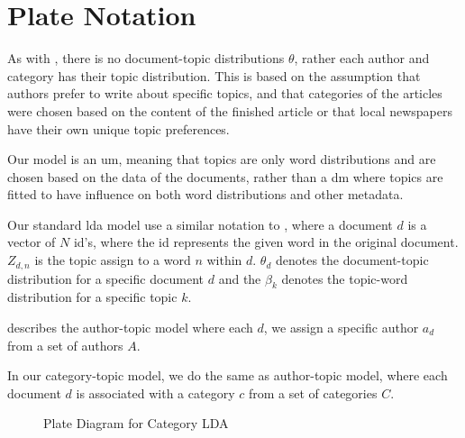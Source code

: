 \section{Plate Notation}
As with \citet{author_topic_2012}, there is no document-topic distributions $\theta$, rather each author and category has their topic distribution.
This is based on the assumption that authors prefer to write about specific topics, and that categories of the articles were chosen based on the content of the finished article or that local newspapers have their own unique topic preferences.

Our model is an \gls{um}, meaning that topics are only word distributions and are chosen based on the data of the documents, rather than a \gls{dm} where topics are fitted to have influence on both word distributions and other metadata.

Our standard \gls{lda} model use a similar notation to \cite{blei2003latent}, where a document $d$ is a vector of $N$ id's, where the id represents the given word in the original document. $Z_{d,n}$ is the topic assign to a word $n$ within $d$.
$\theta_d$ denotes the document-topic distribution for a specific document $d$ and the $\beta_k$ denotes the topic-word distribution for a specific topic $k$.

\citet{author_topic_2012} describes the author-topic model where each $d$, we assign a specific author $a_d$ from a set of authors $A$.

In our category-topic model, we do the same as author-topic model, where each document $d$ is associated with a category $c$ from a set of categories $C$.



\begin{figure*}[ht]
	\centering
	\resizebox{0.7\columnwidth}{!}{%
		
	}
	\resizebox{0.7\columnwidth}{!}{%
		
	}
	\caption{Plate Diagram for Category LDA}
	\label{fig:cat_lda}
\end{figure*}

